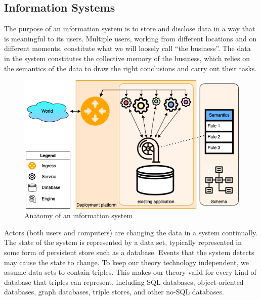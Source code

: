\documentclass[runningheads]{llncs}
\begin{document}
\subsection{Information Systems}
   The purpose of an information system is to store and disclose data in a way that is meaningful to its users.
   Multiple users, working from different locations and on different moments, constitute what we will loosely call ``the business''.
   The data in the system constitutes the collective memory of the business,
   which relies on the semantics of the data to draw the right conclusions and carry out their tasks.
\begin{figure}[bht]
   \begin{center}
     \includegraphics[scale=.45]{figures/datamigration-Pre-migration.png}
   \end{center}
\caption{Anatomy of an information system}
\label{fig:pre-migration}
\end{figure}

   Actors (both users and computers) are changing the data in a system continually.
   The state of the system is represented by a data set, typically represented in some form of persistent store such as a database.
   Events that the system detects may cause the state to change.
   To keep our theory technology independent, we assume data sets to contain triples.
   This makes our theory valid for every kind of database that triples can represent,
   including SQL databases, object-oriented databases, graph databases, triple stores, and other no-SQL databases.
\end{document}
